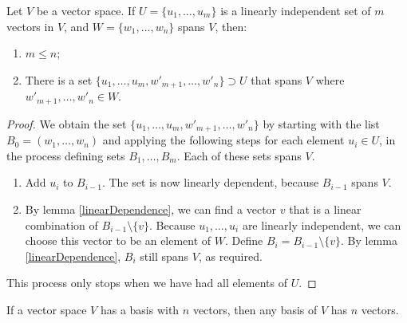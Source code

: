 \begin{theorem} \label{SteinitzExchange}
Let $V$ be a vector space.
If $U = \{u_1, \ldots, u_m\}$ is a linearly independent set of $m$ vectors in $V$, and $W = \{ w_1, \ldots, w_n \}$ spans $V$, then:
\begin{enumerate}
\item $m\leq n$;
\item There is a set $\{u_1, \ldots, u_m, w'_{m+1}, \ldots, w'_n\} \supset U$ that spans $V$ where $w'_{m+1},\ldots, w'_n \in W$.
\end{enumerate}
\end{theorem}
\begin{proof}
We obtain the set $\{u_1, \ldots, u_m, w'_{m+1}, \ldots, w'_n\}$ by starting with the list $B_0 = (w_1, \ldots, w_n)$ and applying the following steps for each element $u_i \in U$, in the process defining sets $B_1, \ldots, B_m$. Each of these sets spans $V$.
\begin{enumerate}
\item Add $u_i$ to $B_{i-1}$. The set is now linearly dependent, because $B_{i-1}$ spans $V$.
\item By lemma \ref{linearDependence}, we can find a vector $v$ that is a linear combination of $B_{i-1}\setminus \{v\}$. Because $u_1,\ldots, u_i$ are linearly independent, we can choose this vector to be an element of $W$. Define $B_i = B_{i-1}\setminus\{v\}$. By lemma \ref{linearDependence}, $B_i$ still spans $V$, as required.
\end{enumerate}
This process only stops when we have had all elements of $U$.
\end{proof}
\begin{corollary}
If a vector space $V$ has a basis with $n$ vectors, then any basis of $V$ has $n$ vectors. \label{nBasis}
\end{corollary}

